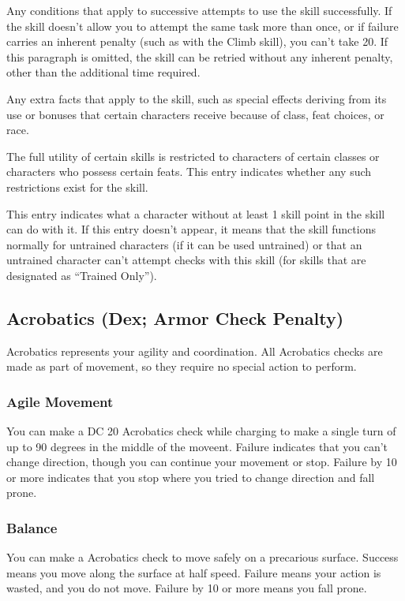  Any conditions that apply to successive attempts to use the skill successfully. If the skill doesn't allow you to attempt the same task more than once, or if failure carries an inherent penalty (such as with the Climb skill), you can't take 20. If this paragraph is omitted, the skill can be retried without any inherent penalty, other than the additional time required.

 Any extra facts that apply to the skill, such as special effects deriving from its use or bonuses that certain characters receive because of class, feat choices, or race.

 The full utility of certain skills is restricted to characters of certain classes or characters who possess certain feats. This entry indicates whether any such restrictions exist for the skill.

 This entry indicates what a character without at least 1 skill point in the skill can do with it. If this entry doesn't appear, it means that the skill functions normally for untrained characters (if it can be used untrained) or that an untrained character can't attempt checks with this skill (for skills that are designated as ``Trained Only'').

\subsection{Acrobatics (Dex; Armor Check Penalty)}
Acrobatics represents your agility and coordination. All Acrobatics checks are made as part of movement, so they require no special action to perform.

\subsubsection{Agile Movement}
You can make a DC 20 Acrobatics check while charging to make a single turn of up to 90 degrees in the middle of the moveent. Failure indicates that you can't change direction, though you can continue your movement or stop. Failure by 10 or more indicates that you stop where you tried to change direction and fall prone.

\subsubsection{Balance}
You can make a Acrobatics check to move safely on a precarious surface. Success means you move along the surface at half speed. Failure means your action is wasted, and you do not move. Failure by 10 or more means you fall prone.

